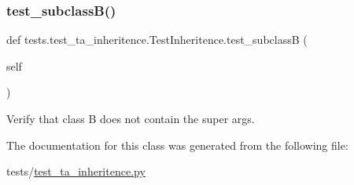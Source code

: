 \subsubsection{\texorpdfstring{test\+\_\+subclass\+B()}{test\_subclassB()}}
{\footnotesize\ttfamily def tests.\+test\+\_\+ta\+\_\+inheritence.\+Test\+Inheritence.\+test\+\_\+subclassB (\begin{DoxyParamCaption}\item[{}]{self }\end{DoxyParamCaption})}

\begin{DoxyVerb}Verify that class B does not contain the super args.
\end{DoxyVerb}
 

The documentation for this class was generated from the following file\+:\begin{DoxyCompactItemize}
\item 
tests/\hyperlink{test__ta__inheritence_8py}{test\+\_\+ta\+\_\+inheritence.\+py}\end{DoxyCompactItemize}
